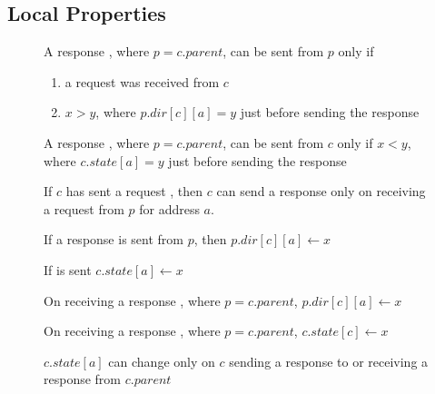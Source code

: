 \subsection{Local Properties}
\label{sec:localProperties}


\begin{figure}\small
\begin{inv}
A response , where $p = c.parent$, can be sent from $p$ only
if
\begin{enumerate}
\item a request  was received from $c$
\item $x > y$, where $p.dir[c][a] = y$ just before sending the response
\end{enumerate}
\label{pSendRespPre}
\end{inv}
\begin{inv}
A response , where $p = c.parent$, can be sent from $c$ only
if $x < y$, where $c.state[a] = y$ just before sending the
response\label{cSendRespPre1}
\end{inv}
\begin{inv}
If $c$ has sent a request , then $c$ can send a response
 only on receiving a request from $p$ for address $a$.
\label{cSendRespPre2}
\end{inv}
%
\begin{inv}
If a response  is sent from $p$, then $p.dir[c][a] \gets x$\label{cSendRespPost}
\end{inv}
\begin{inv}
If  is sent $c.state[a] \gets x$\label{pSendRespPost}
\end{inv}
\begin{inv}
On receiving a response , where $p = c.parent$, $p.dir[c][a]
\gets x$\label{pRecvResp}
\end{inv}
\begin{inv}
On receiving a response , where $p = c.parent$, $c.state[c]
\gets x$\label{cRecvResp}
\end{inv}
\begin{inv}
$c.state[a]$ can change only on $c$ sending a response to or receiving a
response from $c.parent$\label{cState}
\end{inv}

\end{figure}
